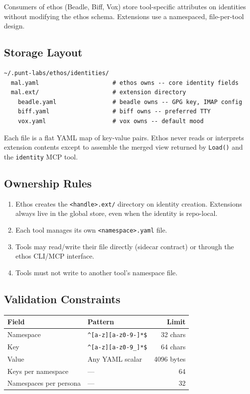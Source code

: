 \documentclass[a4paper,10pt]{article}
\newcommand{\tool}[1]{\texttt{#1}}
\newcommand{\fpath}[1]{\texttt{#1}}
\begin{document}
Consumers of ethos (Beadle, Biff, Vox) store tool-specific attributes
on identities without modifying the ethos schema.  Extensions use a
namespaced, file-per-tool design.

\subsection{Storage Layout}

\begin{verbatim}
~/.punt-labs/ethos/identities/
  mal.yaml                     # ethos owns -- core identity fields
  mal.ext/                     # extension directory
    beadle.yaml                # beadle owns -- GPG key, IMAP config
    biff.yaml                  # biff owns -- preferred TTY
    vox.yaml                   # vox owns -- default mood
\end{verbatim}

Each file is a flat YAML map of key-value pairs.  Ethos never reads
or interprets extension contents except to assemble the merged view
returned by \texttt{Load()} and the \tool{identity} MCP tool.

\subsection{Ownership Rules}

\begin{enumerate}
  \item Ethos creates the \fpath{<handle>.ext/} directory on identity
    creation.  Extensions always live in the global store, even when
    the identity is repo-local.
  \item Each tool manages its own \fpath{<namespace>.yaml} file.
  \item Tools may read/write their file directly (sidecar contract) or
    through the ethos CLI/MCP interface.
  \item Tools must not write to another tool's namespace file.
\end{enumerate}

\subsection{Validation Constraints}

\begin{center}
\begin{tabular}{@{}llr@{}}
\toprule
\textbf{Field} & \textbf{Pattern} & \textbf{Limit} \\
\midrule
Namespace   & \verb|^[a-z][a-z0-9-]*$|    & 32 chars \\
Key         & \verb|^[a-z][a-z0-9_]*$|    & 64 chars \\
Value       & Any YAML scalar             & 4096 bytes \\
Keys per namespace    & ---               & 64 \\
Namespaces per persona & ---              & 32 \\
\bottomrule
\end{tabular}
\end{center}
\end{document}

